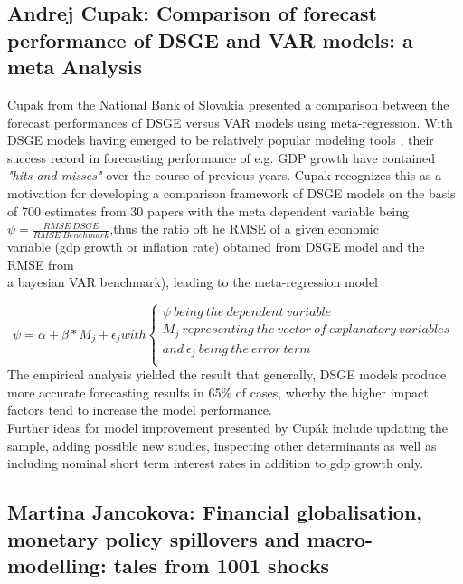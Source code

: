 \documentclass[a4paper,man,natbib]{apa6}
\begin{document}
\subsection{Andrej Cupak: Comparison of forecast performance of DSGE and VAR models: a meta Analysis}

Cupak from the National Bank of Slovakia presented a comparison between the forecast performances of DSGE versus VAR models using meta-regression. With DSGE models having emerged to be relatively popular modeling tools \cite{Linde2016}, their success record in forecasting performance of e.g. GDP growth have contained \textit{"hits and misses"} over the course of previous years. Cupak recognizes this as a motivation for developing a comparison framework of DSGE models on the basis of 700 estimates from 30 papers with the meta dependent variable being 
$\psi  = \frac{RMSE\ DSGE}{RMSE\ Benchmark}$,thus the ratio oft he RMSE of a given economic \\variable (gdp growth or inflation rate) obtained from DSGE model and the RMSE from \\a bayesian VAR benchmark), leading to the meta-regression model 

\begin{equation}
\psi= \alpha + \beta * M_j + \epsilon_j with \left\{
\begin{array}{ll}
\psi\ being\ the\ dependent\ variable\\
M_j\ representing\ the\ vector\ of\ explanatory\ variables\ \\
and\ \epsilon_j\ being\ the\ error\ term \\
\end{array}
\right.
\end{equation}
The empirical analysis yielded the result that generally, DSGE models produce more accurate forecasting results in 65\% of cases, wherby the higher impact factors tend to increase the model performance.\\
Further ideas for model improvement presented by Cupák include updating the sample, adding possible new studies, inspecting other determinants as well as including nominal short term interest rates in addition to gdp growth only.


\subsection{Martina Jancokova: Financial globalisation, monetary policy spillovers and	macro-modelling: tales from 1001 shocks}
\end{document}
